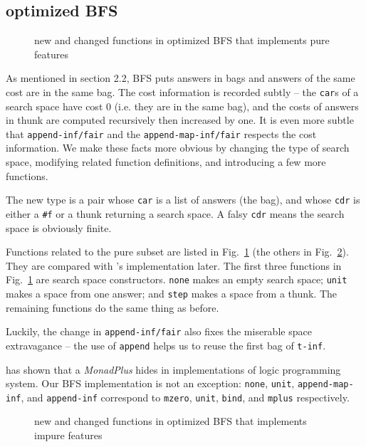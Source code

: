 \documentclass[format=acmlarge, review=true, authordraft=true]{acmart}
\begin{document}
\subsection{optimized BFS}

\begin{figure}
		
	\caption{new and changed functions in optimized BFS that implements pure 
	features}
	\label{BFS-opt}
\end{figure}

As mentioned in section 2.2, BFS puts answers in bags and answers of the 
same cost are in the same bag. The cost
information is recorded subtly -- the \texttt{car}s of a search space have cost 
0 (i.e. they are in the same bag), and the costs of answers in thunk are 
computed recursively then increased by one. It is even more subtle that
\texttt{append-inf/fair} and the \texttt{append-map-inf/fair} respects the cost 
information. We make these facts more obvious by changing the type of search 
space, modifying related function definitions, and introducing a few more 
functions.

The new type is a pair whose \texttt{car} is a list of answers (the bag), and 
whose \texttt{cdr} is either a \texttt{\#{}f} or a thunk returning a search 
space. A falsy \texttt{cdr} means the search space is obviously finite. 

Functions related to the pure subset are listed in Fig.~\ref{BFS-opt} (the 
others in Fig.~\ref{BFS-opt-cont}). They are compared with 
\citeauthor{seres1999algebra}'s implementation later. The first three functions 
in Fig.~\ref{BFS-opt} are search space constructors. \texttt{none} makes an 
empty search space; \texttt{unit} makes a space from one answer; and 
\texttt{step} makes a space from a thunk. The remaining functions do the same 
thing as before. 

Luckily, the change in \texttt{append-inf/fair} also fixes the miserable space 
extravagance -- the use of \texttt{append} helps us to reuse the first bag of 
\texttt{t-inf}.

\citet{kiselyov2005backtracking} has shown that a \emph{MonadPlus} hides in 
implementations of logic programming system. Our BFS implementation is not an 
exception: \texttt{none}, \texttt{unit}, \texttt{append-map-inf}, and 
\texttt{append-inf} correspond to \texttt{mzero}, \texttt{unit}, \texttt{bind}, 
and \texttt{mplus} respectively.

\begin{figure}
		
	\caption{new and changed functions in optimized BFS that implements impure 
		features}
	\label{BFS-opt-cont}
\end{figure}
\end{document}
